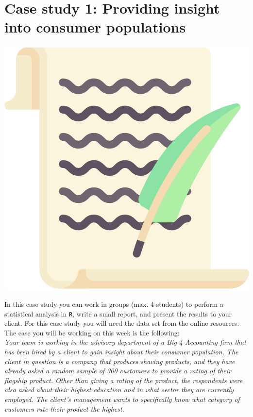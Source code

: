 
\begin{minipage}{0.8\textwidth}
\section{Case study 1: Providing insight into consumer populations}
\end{minipage}%
\hfill%
\begin{minipage}{0.1\textwidth}
\includegraphics[width=\linewidth]{Files/Images/lettericon.pdf}
\end{minipage}
\vspace*{.1cm}

In this case study you can work in groups (max. 4 students) to perform a statistical analysis in \texttt{R}, write a small report, and present the results to your client. For this case study you will need the data set  from the online resources. The case you will be working on this week is the following: \\

\textit{Your team is working in the advisory department of a Big 4 Accounting firm that has been hired by a client to gain insight about their consumer population. The client in question is a company that produces shaving products, and they have already asked a random sample of 300 customers to provide a rating of their flagship product. Other than giving a rating of the product, the respondents were also asked about their highest education and in what sector they are currently employed. The client's management wants to specifically know what category of customers rate their product the highest.} \\

